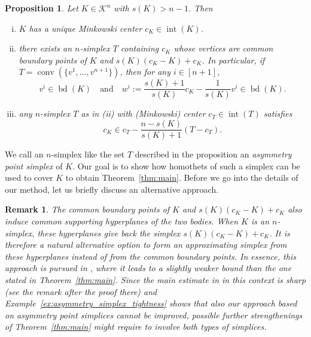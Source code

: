 \documentclass{amsart}
\newtheorem{remark}[theorem]{Remark}
\newtheorem{proposition}[theorem]{Proposition}
\newcommand{\cemph}[1]{\emph{\color{red}#1}}
\newcommand\CK{\mathcal{K}}
\DeclareMathOperator{\conv}{conv}
\DeclareMathOperator{\inte}{int}
\DeclareMathOperator{\bd}{bd}
\begin{document}
\begin{proposition}\label{prop:böröczky}
Let $K \in \CK^n$ with $s(K) > n-1$.
Then
\begin{enumerate}[(i)]
\item $K$ has a unique Minkowski center $c_K \in \inte(K)$.
\item there exists an $n$-simplex $T$ containing $c_K$ whose vertices are common boundary points of $K$ and $s(K) (c_K - K) + c_K$.
In particular, if $T = \conv(\{ v^1, \dots, v^{n+1} \})$, then for any $i \in [n+1]$,
\[
    v^i \in \bd(K)
        \quad \text{and} \quad
    w^i := \frac{s(K) + 1}{s(K)} c_K - \frac{1}{s(K)} v^i \in \bd(K).
\]
\item any $n$-simplex $T$ as in (ii) with (Minkowski) center $c_T \in \inte(T)$ satisfies
\[
    c_K
    \in c_T - \frac{n - s(K)}{s(K) + 1} (T - c_T).
\]
\end{enumerate}
\end{proposition}


We call an $n$-simplex like the set $T$ described in the proposition an \cemph{asymmetry point simplex} of $K$.
Our goal is to show how homothets of such a simplex can be used to cover $K$ to obtain Theorem~\ref{thm:main}.
Before we go into the details of our method, let us briefly discuss an alternative approach.

\begin{remark}
The common boundary points of $K$ and $s(K) (c_K - K) + c_K$ also induce common supporting hyperplanes of the two bodies.
When $K$ is an $n$-simplex, these hyperplanes give back the simplex $s(K) (c_K - K) + c_K$.
It is therefore a natural alternative option to form an approximating simplex from these hyperplanes instead of from the common boundary points.
In essence, this approach is pursued in \cite{2026:BakaevYehudayoff},
where it leads to a slightly weaker bound than the one stated in Theorem~\ref{thm:main}.
Since the main estimate in \cite{2026:BakaevYehudayoff} in this context is sharp (see the remark after the proof there) and Example~\ref{ex:asymmetry_simplex_tightness} shows that also our approach based on asymmetry point simplices cannot be improved, possible further strengthenings of Theorem~\ref{thm:main} might require to involve both types of simplices.
\end{remark}
\end{document}
